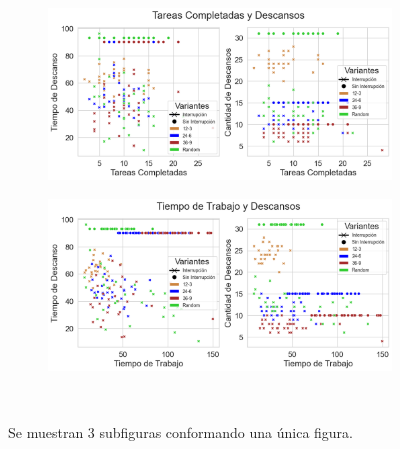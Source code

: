 \documentclass[10pt,a4paper,twocolumn]{article}
\begin{document}
\begin{figure}[ht!]
    \begin{subfigure}{.50\linewidth}
        \includegraphics[height=.90\linewidth, width=.95\linewidth]{tareas_completadas_y_descansos.png}
        \caption{}
        \label{fig3a}
    \end{subfigure}
    \begin{subfigure}{.50\linewidth}
        \includegraphics[height=.90\linewidth, width=.95\linewidth]{Tiempo_de_trabajo_y_descansos.png}
        \caption{}
        \label{fig3b}
    \end{subfigure}\\
    
    \caption{Se muestran 3 subfiguras conformando una \'unica figura.}
    \label{fig3}
\end{figure}
\end{document}
